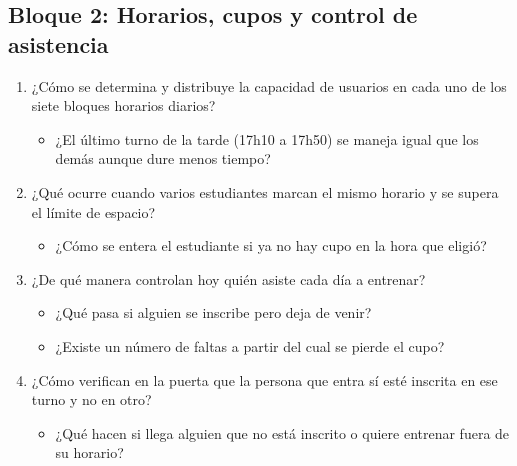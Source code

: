 \subsection*{Bloque 2: Horarios, cupos y control de asistencia}
\begin{enumerate}[resume*=preguntas]
  \item ¿Cómo se determina y distribuye la capacidad de usuarios en cada uno de los siete bloques horarios diarios?
  \begin{itemize}
    \item[R:] ¿El último turno de la tarde (17h10 a 17h50) se maneja igual que los demás aunque dure menos tiempo?
  \end{itemize}
  \item ¿Qué ocurre cuando varios estudiantes marcan el mismo horario y se supera el límite de espacio?
  \begin{itemize}
    \item[R:] ¿Cómo se entera el estudiante si ya no hay cupo en la hora que eligió?
  \end{itemize}
  \item ¿De qué manera controlan hoy quién asiste cada día a entrenar?
  \begin{itemize}
    \item[R:] ¿Qué pasa si alguien se inscribe pero deja de venir?
    \item[R:] ¿Existe un número de faltas a partir del cual se pierde el cupo?
  \end{itemize}
  \item ¿Cómo verifican en la puerta que la persona que entra sí esté inscrita en ese turno y no en otro?
  \begin{itemize}
    \item[R:] ¿Qué hacen si llega alguien que no está inscrito o quiere entrenar fuera de su horario?
  \end{itemize}
\end{enumerate}

